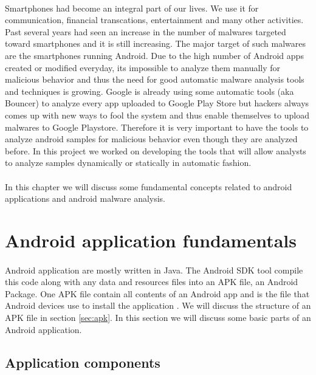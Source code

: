 \documentclass[../main.tex]{subfile}
\begin{document}
	\paragraph{} Smartphones had become an integral part of our lives. We use it for communication, financial transcations, entertainment and many other activities. Past several years had seen an increase in the number of malwares targeted toward smartphones and it is still increasing. The major target of such malwares are the smartphones running Android. Due to the high number of Android apps created or modified everyday, its impossible to analyze them manually for malicious behavior and thus the need for good automatic malware analysis tools and techniques is growing. Google is already using some automatic tools (aka Bouncer) to analyze every app uploaded to Google Play Store but hackers always comes up with new ways to fool the system and thus enable themselves to upload malwares to Google Playstore. Therefore it is very important to have the tools to analyze android samples for malicious behavior even though they are analyzed before. In this project we worked on developing the tools that will allow analysts to analyze samples dynamically or statically in automatic fashion.
	\paragraph{} In this chapter we will discuss some fundamental concepts related to android applications and android malware analysis.
	
	\section{Android application fundamentals}\label{sec:app_fundamentals}
		\paragraph{} Android application are mostly written in Java. The Android SDK tool compile this code along with any data and resources files into an APK file, an Android Package. One APK file contain all contents of an Android app and is the file that Android devices use to install the application \cite{app_fundamentals}. We will discuss the structure of an APK file in section \ref{sec:apk}. In this section we will discuss some basic parts of an Android application.
		
		\subsection{Application components}
\end{document}
